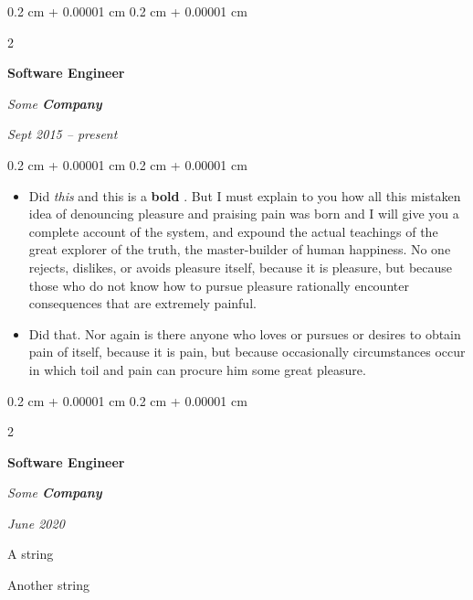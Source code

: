 \documentclass[10pt, letterpaper]{article}
\newenvironment{summary}{
    \begin{description}[
        topsep=0.10 cm,
        parsep=0.10 cm,
        partopsep=0pt,
        itemsep=0pt,
        leftmargin=0.4 cm + 10pt
    ]
}{
    \end{description}
} %
\newenvironment{highlights}{
    \begin{itemize}[
        topsep=0.10 cm,
        parsep=0.10 cm,
        partopsep=0pt,
        itemsep=0pt,
        leftmargin=0.4 cm + 10pt
    ]
}{
    \end{itemize}
} %
\newenvironment{onecolentry}{
    \begin{adjustwidth}{
        0.2 cm + 0.00001 cm
    }{
        0.2 cm + 0.00001 cm
    }
}{
    \end{adjustwidth}
} %
\newenvironment{twocolentry}[2][]{
    \onecolentry
    \def\secondColumn{#2}
    \setcolumnwidth{\fill, 4.5 cm}
    \begin{paracol}{2}
}{
    \switchcolumn \raggedleft \secondColumn
    \end{paracol}
    \endonecolentry
} %
\let\hrefWithoutArrow\href
\renewcommand{\href}[2]{\hrefWithoutArrow{#1}{\ifthenelse{\equal{#2}{}}{ }{#2 }\raisebox{.15ex}{\footnotesize \faExternalLink*}}}
\begin{document}
        \vspace{0.2 cm}

        \begin{twocolentry}{
            
            
        \textit{Sept 2015 – present}}
            \textbf{Software Engineer}
            
            \textit{Some \textbf{Company}}
        \end{twocolentry}
        \vspace{0.10 cm}
        \begin{onecolentry}
            \begin{highlights}
                \item Did \textit{this} and this is a \textbf{bold} \href{https://example.com}{link}. But I must explain to you how all this mistaken idea of denouncing pleasure and praising pain was born and I will give you a complete account of the system, and expound the actual teachings of the great explorer of the truth, the master-builder of human happiness. No one rejects, dislikes, or avoids pleasure itself, because it is pleasure, but because those who do not know how to pursue pleasure rationally encounter consequences that are extremely painful.
                \item Did that. Nor again is there anyone who loves or pursues or desires to obtain pain of itself, because it is pain, but because occasionally circumstances occur in which toil and pain can procure him some great pleasure.
            \end{highlights}
        \end{onecolentry}


        \vspace{0.2 cm}

        \begin{twocolentry}{
            
            
        \textit{June 2020}}
            \textbf{Software Engineer}
            
            \textit{Some \textbf{Company}}
        \end{twocolentry}
            \begin{summary}
                \item A string
                \item Another string
            \end{summary}


        \vspace{0.2 cm}
\end{document}
